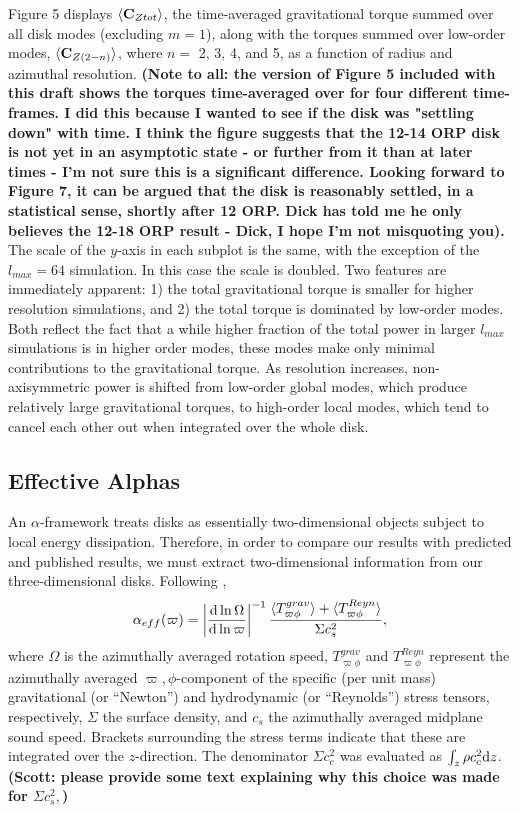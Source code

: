 \documentclass[manuscript]{aastex} %
\begin{document}
Figure 5 displays $\langle {\rm \bf C}_{Ztot} \rangle$, the time-averaged gravitational torque summed over all disk modes (excluding $m=1$), along with the torques summed over low-order modes, $\langle {\rm \bf C}_{Z(2-n)} \rangle$, where $n = $ 2, 3, 4, and 5, as a function of radius and azimuthal resolution. 
{\bf (Note to all: the version of Figure 5 included with this draft  shows the torques
time-averaged over for four different time-frames.  I did this because I wanted to see if the disk was 
"settling down" with time.  I think the figure suggests  that the 12-14 ORP disk is not
yet in an asymptotic state - or further from it than at later times - I'm not sure this is
a significant difference.  Looking forward to Figure 7, it can be argued that the
disk is reasonably settled, in a statistical sense, shortly after 12 ORP.
Dick has told me he only believes the 12-18 ORP result - Dick, I hope 
I'm not misquoting you).  
} 
The scale of the $y$-axis in each subplot is the same, with the exception of the $l_{max} = 64$ simulation. 
In this case the scale is doubled.  Two features are immediately apparent: 1) the total gravitational torque is smaller for higher resolution simulations, and 2) the total torque is dominated by low-order modes. Both reflect the fact that a while higher fraction of the total power in larger $l_{max}$ simulations is in higher order modes, these modes make only minimal contributions to the gravitational torque. As resolution increases, non-axisymmetric power is shifted from low-order global modes, which produce relatively large gravitational torques, to high-order local modes, which tend to cancel each other out when integrated over the whole disk. 

\subsection{Effective Alphas}

An $\alpha$-framework treats disks as essentially two-dimensional objects subject to local energy dissipation.  Therefore, in order to compare our results with predicted and published results, we must extract two-dimensional information from our three-dimensional disks.  Following \citet{lodato2004}, 
\begin{equation}
\alpha_{eff}(\varpi) = \left| \frac{{\rm d} \ln \Omega}{{\rm d} \ln \varpi} \right|^{-1} 
\frac {\langle T_{\varpi\phi}^{grav}\rangle + \langle T_{\varpi\phi}^{Reyn}\rangle}
{\Sigma c_s^2},
\end{equation}
where $\Omega$ is the azimuthally averaged rotation speed, $T_{\varpi\phi}^{grav}$ and $T_{\varpi\phi}^{Reyn}$ represent the azimuthally averaged $\varpi,\phi$-component of the specific (per unit mass) gravitational 
(or ``Newton'') and hydrodynamic (or ``Reynolds'') stress tensors, respectively, $\Sigma$ the surface density,
and $c_s$ the azimuthally averaged midplane sound speed.  Brackets surrounding the stress terms indicate that these are integrated over the $z$-direction. The denominator $\Sigma c_c^2$ was evaluated as $\int_z \rho c_c^2 {\rm d}z$. {\bf (Scott: please provide some text explaining why this choice was made for
${\Sigma c_s^2},$)}
 
\end{document}
